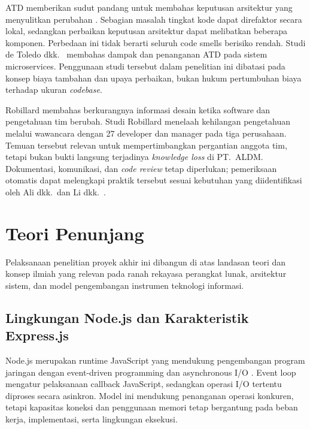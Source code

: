 \documentclass[12pt,a4paper,oneside]{report}
\begin{document}
ATD memberikan sudut pandang untuk membahas keputusan arsitektur yang menyulitkan perubahan \cite{sousa2023atd,verdecchia2021theory}. Sebagian masalah tingkat kode dapat direfaktor secara lokal, sedangkan perbaikan keputusan arsitektur dapat melibatkan beberapa komponen. Perbedaan ini tidak berarti seluruh code smells berisiko rendah. Studi de Toledo dkk.\ \cite{toledo2021identifying,toledo2022accumulation} membahas dampak dan penanganan ATD pada sistem microservices. Penggunaan studi tersebut dalam penelitian ini dibatasi pada konsep biaya tambahan dan upaya perbaikan, bukan hukum pertumbuhan biaya terhadap ukuran \textit{codebase}.

Robillard \cite{robillard2016sustainable} membahas berkurangnya informasi desain ketika software dan pengetahuan tim berubah. Studi Robillard \cite{robillard2021turnover} menelaah kehilangan pengetahuan melalui wawancara dengan 27 developer dan manager pada tiga perusahaan. Temuan tersebut relevan untuk mempertimbangkan pergantian anggota tim, tetapi bukan bukti langsung terjadinya \textit{knowledge loss} di PT.\ ALDM. Dokumentasi, komunikasi, dan \textit{code review} tetap diperlukan; pemeriksaan otomatis dapat melengkapi praktik tersebut sesuai kebutuhan yang diidentifikasi oleh Ali dkk.\ dan Li dkk.\ \cite{ali2017architecture,strasser2021understanding}.

\section{Teori Penunjang}
\label{sec:teori_penunjang}

Pelaksanaan penelitian proyek akhir ini dibangun di atas landasan teori dan konsep ilmiah yang relevan pada ranah rekayasa perangkat lunak, arsitektur sistem, dan model pengembangan instrumen teknologi informasi.

\subsection{Lingkungan Node.js dan Karakteristik Express.js}

Node.js merupakan runtime JavaScript yang mendukung pengembangan program jaringan dengan event-driven programming dan asynchronous I/O \cite{tilkov2010node}. Event loop mengatur pelaksanaan callback JavaScript, sedangkan operasi I/O tertentu diproses secara asinkron. Model ini mendukung penanganan operasi konkuren, tetapi kapasitas koneksi dan penggunaan memori tetap bergantung pada beban kerja, implementasi, serta lingkungan eksekusi.
\end{document}
